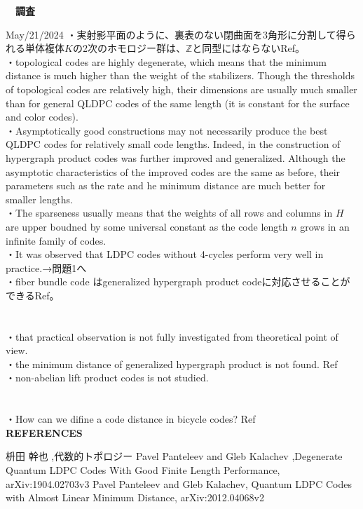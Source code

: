 \documentclass[a4paper,10.5pt]{ltjsarticle}
\begin{document}
\centerline
{\huge \bfseries　調査}
\rightline
{May/21/2024}
\leftline
{}
・実射影平面のように、裏表のない閉曲面を3角形に分割して得られる単体複体$K$の2次のホモロジー群は、$\mathbb{Z}$と同型にはならないRef\cite{1}。\\
・topological codes are highly degenerate, which means that the minimum distance is much higher than the weight of the stabilizers. Though the thresholds of topological
codes are relatively high, their dimensions are usually much smaller than for general QLDPC codes of the same length (it is constant for the surface and color codes).\\
・Asymptotically good constructions may not necessarily produce the best QLDPC codes for relatively small code lengths. Indeed, in the construction of hypergraph product codes was further improved and generalized. Although the asymptotic characteristics of the improved codes are the same as before, their parameters such as the rate and he minimum distance are much better for smaller lengths.\\
・The sparseness usually means that the weights of all rows and columns in $H$ are upper boudned by some universal constant as the code length $n$ grows in an infinite family of codes.\\
・It was observed that LDPC codes without 4-cycles perform very well in practice.→問題1へ\\
・fiber bundle code はgeneralized hypergraph product codeに対応させることができるRef\cite{3}。\\
\\
\\
・that practical observation is not fully investigated from theoretical point of view.\\
・the minimum distance of generalized hypergraph product is not found. Ref\cite{2}\\
・non-abelian lift product codes is not studied.\\
\\
\\
・How can we difine a code distance in bicycle codes? Ref\cite{2}\\
\clearpage
{\Large \bfseries REFERENCES}
\begin{thebibliography}{1}
\vspace{-1.5cm}
   枡田 幹也 ,代数的トポロジー
   Pavel Panteleev and Gleb Kalachev ,Degenerate Quantum LDPC Codes With Good Finite Length Performance, arXiv:1904.02703v3
   Pavel Panteleev and Gleb Kalachev, Quantum LDPC Codes with Almost Linear
Minimum Distance, arXiv:2012.04068v2

\end{thebibliography}
\end{document}
